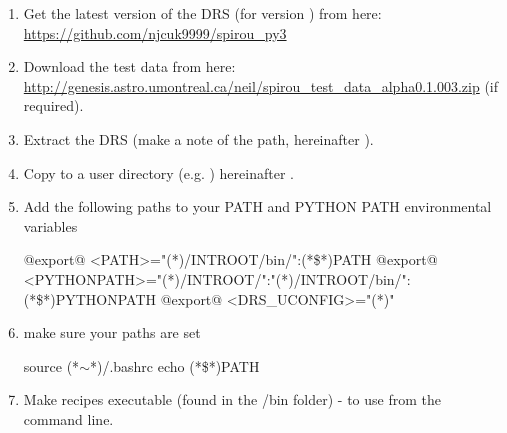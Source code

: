 \begin{enumerate}

\item Get the latest version of the DRS (for \instrument version \MyCodeVersion) from here: \url{https://github.com/njcuk9999/spirou_py3}

\item Download the test data from here: \url{http://genesis.astro.umontreal.ca/neil/spirou_test_data_alpha0.1.003.zip} (if required).

\item Extract the DRS (make a note of the path, hereinafter \InstallDIR).

\item Copy \InstallDIR{} to a user directory (e.g. ) hereinafter \userDIR.

\item Add the following paths to your PATH and PYTHON PATH environmental variables

	\begin{bashbox}[title={e.g. in $\sim$/.bashrc}]
	@export@ <PATH>="(*\InstallDIR*)/INTROOT/bin/":{(*\$*)PATH}
	@export@ <PYTHONPATH>="(*\InstallDIR*)/INTROOT/":"(*\InstallDIR*)/INTROOT/bin/":{(*\$*)PYTHONPATH}
	@export@ <DRS_UCONFIG>="(*\userDIR*)"
	\end{bashbox}

\item make sure your paths are set
	\begin{cmdbox}
	source (*$\sim$*)/.bashrc
	echo (*\$*)PATH
	\end{cmdbox}

\item Make recipes executable (found in the \InstallDIR/bin folder) - to use from the command line.


\end{enumerate}
